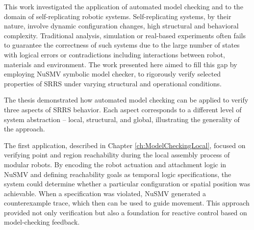 %
%
%





This work investigated the application of automated model checking and 
to the domain of self-replicating robotic systems.
Self-replicating systems, by their nature, involve dynamic configuration changes, high 
structural and behavioral complexity.
Traditional analysis, simulation or real-based experiments often fails to guarantee the 
correctness of such systems due to the large number of states with logical errors 
or contradictions including interactions between robot, materials and environment. 
The work presented here aimed to fill this gap by employing NuSMV symbolic model checker, 
to rigorously verify selected properties of SRRS under varying structural and 
operational conditions.

The thesis demonstrated how automated model checking can be applied to 
verify three aspects of SRRS behavior. 
Each aspect corresponds to a different level of system abstraction -- 
local, structural, and global, illustrating the generality of the approach.

The first application, described in Chapter \ref{ch:ModelCheckingLocal}, 
focused on verifying point and region reachability during 
the local assembly process of modular robots. By encoding the robot
actuation and attachment logic in NuSMV and defining reachability goals 
as temporal logic specifications, the system could determine whether a 
particular configuration or spatial position was achievable. When a 
specification was violated, NuSMV generated a counterexample trace, 
which then can be used to guide  movement. 
This approach provided not only verification but also a 
foundation for reactive control based on model-checking feedback.

